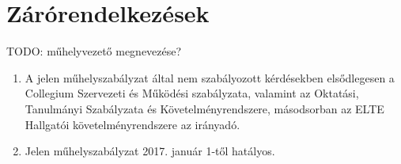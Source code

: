 \documentclass{rulebook}
\begin{document}
\section{Zárórendelkezések}

TODO: műhelyvezető megnevezése?
\begin{enumerate}
	\item A jelen műhelyszabályzat által nem szabályozott kérdésekben elsődlegesen a Collegium Szervezeti és Működési szabályzata, valamint az Oktatási, Tanulmányi Szabályzata és Követelményrendszere, másodsorban az ELTE Hallgatói követelményrendszere az irányadó.
	\item Jelen műhelyszabályzat 2017. január 1-től hatályos.
\end{enumerate}
\end{document}
